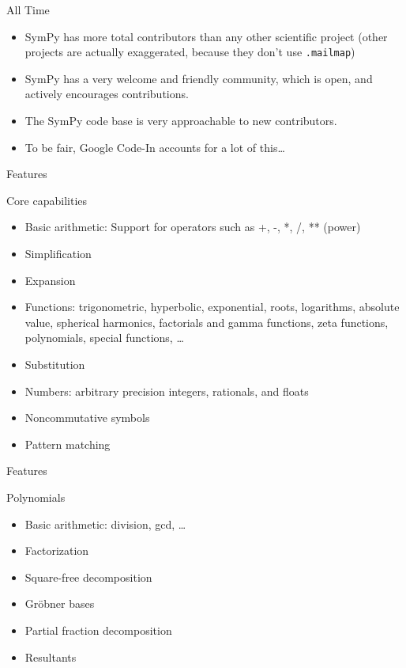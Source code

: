 \documentclass[xcolor=svgnames]{beamer}
\begin{document}
\begin{frame}
\begin{block}{All Time}
\begin{itemize}
\item SymPy has more total contributors than any other scientific project
  (other projects are actually exaggerated, because they don't use
  \texttt{.mailmap})
\item SymPy has a very welcome and friendly community, which is open, and
  actively encourages contributions.
\item The SymPy code base is very approachable to new contributors.
\item To be fair, Google Code-In accounts for a lot of this\ldots
\end{itemize}
\end{block}
\end{frame}

\begin{frame}{Features}
  \begin{block}{Core capabilities}
    \begin{itemize}
    \item Basic arithmetic: Support for operators such as +, -, *, /, ** (power)
    \item Simplification
    \item Expansion
    \item Functions: trigonometric, hyperbolic, exponential, roots, logarithms,
      absolute value, spherical harmonics, factorials and gamma functions, zeta
      functions, polynomials, special functions, \ldots
    \item Substitution
    \item Numbers: arbitrary precision integers, rationals, and floats
    \item Noncommutative symbols
    \item Pattern matching
    \end{itemize}
  \end{block}
\end{frame}

\begin{frame}{Features}
  \begin{block}{Polynomials}
    \begin{itemize}
    \item Basic arithmetic: division, gcd, \ldots
    \item Factorization
    \item Square-free decomposition
    \item Gröbner bases
    \item Partial fraction decomposition
    \item Resultants
    \end{itemize}
  \end{block}
\end{frame}
\end{document}
